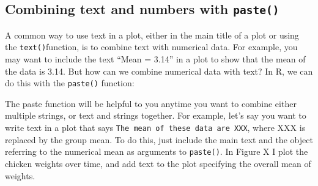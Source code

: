 \documentclass[]{book}
\newenvironment{Shaded}{\begin{snugshade}}{\end{snugshade}}
\newcommand{\KeywordTok}[1]{\textcolor[rgb]{0.13,0.29,0.53}{\textbf{{#1}}}}
\newcommand{\DataTypeTok}[1]{\textcolor[rgb]{0.13,0.29,0.53}{{#1}}}
\newcommand{\DecValTok}[1]{\textcolor[rgb]{0.00,0.00,0.81}{{#1}}}
\newcommand{\StringTok}[1]{\textcolor[rgb]{0.31,0.60,0.02}{{#1}}}
\newcommand{\CommentTok}[1]{\textcolor[rgb]{0.56,0.35,0.01}{\textit{{#1}}}}
\newcommand{\NormalTok}[1]{{#1}}
\theoremstyle{definition}
\theoremstyle{definition}
\theoremstyle{remark}
\begin{document}
\subsection{\texorpdfstring{Combining text and numbers with
\texttt{paste()}}{Combining text and numbers with paste()}}\label{combining-text-and-numbers-with-paste}

A common way to use text in a plot, either in the main title of a plot
or using the \texttt{text()}function, is to combine text with numerical
data. For example, you may want to include the text ``Mean = 3.14'' in a
plot to show that the mean of the data is 3.14. But how can we combine
numerical data with text? In R, we can do this with the \texttt{paste()}
function:

The paste function will be helpful to you anytime you want to combine
either multiple strings, or text and strings together. For example,
let's say you want to write text in a plot that says
\texttt{The\ mean\ of\ these\ data\ are\ XXX}, where XXX is replaced by
the group mean. To do this, just include the main text and the object
referring to the numerical mean as arguments to \texttt{paste()}. In
Figure X I plot the chicken weights over time, and add text to the plot
specifying the overall mean of weights.

\begin{Shaded}
\end{Shaded}
\end{document}
